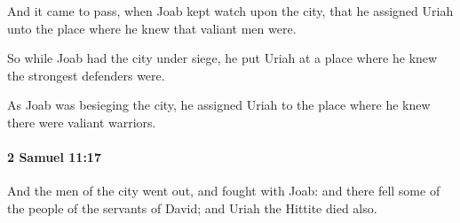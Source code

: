 			\begin{versebox}
					\item[BHS] 
					\item[ASV] And it came to pass, when Joab kept watch upon the city, that he assigned Uriah unto the place where he knew that valiant men were.
					\item[NIV] So while Joab had the city under siege, he put Uriah at a place where he knew the strongest defenders were.
					\item[NRSV] As Joab was besieging the city, he assigned Uriah to the place where he knew there were valiant warriors.
			\end{versebox}

		\paragraph{2 Samuel 11:17} %
			\label{2SAMUEL-11-17}

			And the men of the city went out, and fought with Joab: and there fell some of the people of the servants of David; and Uriah the Hittite died also.

